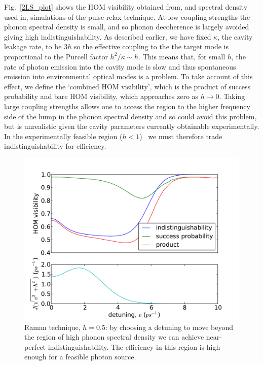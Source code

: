 Fig.~\ref{2LS_plot} shows the HOM visibility obtained from, and spectral density used in, simulations of the pulse-relax technique. At low coupling strengths the phonon spectral density is small, and so phonon decoherence is largely avoided giving high indistinguishability. As described earlier, we have fixed $\kappa$, the cavity leakage rate, to be $3 h$ so the effective coupling to the the target mode is proportional to the Purcell factor $h^2/\kappa \sim h$. This means that, for small $h$, the rate of photon emission into the cavity mode is slow and thus spontaneous emission into environmental optical modes is a problem. To take account of this effect, we define the `combined HOM visibility', which is the product of success probability and bare HOM visibility, which approaches zero as $h \to 0$. Taking large coupling strengths allows one to access the region to the higher frequency side of the hump in the phonon spectral density and so could avoid this problem, but is unrealistic given the cavity parameters currently obtainable experimentally. In the experimentally feasible region ($h<1$)~\cite{vuckovic:12} we must therefore trade indistinguishability for efficiency.

\begin{figure}[htb]
  \begin{center}
  \includegraphics[width=12cm]{assets/raman_plot.pdf}
  \end{center}
  \caption{Raman technique, $h = 0.5$: by choosing a detuning to move beyond the region of high phonon spectral density we can achieve near-perfect indistinguishability. The efficiency in this region is high enough for a feasible photon source.}
  \label{raman_plot}
\end{figure}


